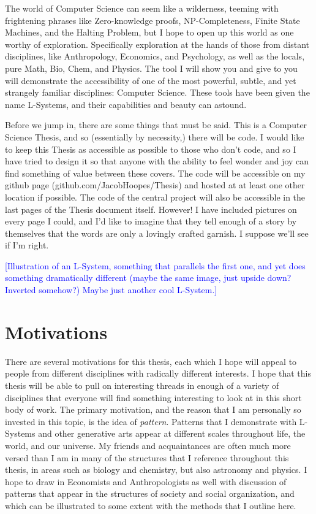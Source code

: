\documentclass[12pt,twoside]{reedthesis}
\begin{document}
The world of Computer Science can seem like a wilderness, teeming with frightening phrases like Zero-knowledge proofs, NP-Completeness, Finite State Machines, and the Halting Problem, but I hope to open up this world as one worthy of exploration. Specifically exploration at the hands of those from distant disciplines, like Anthropology, Economics, and Psychology, as well as the locals, pure Math, Bio, Chem, and Physics. The tool I will show you and give to you will demonstrate the accessibility of one of the most powerful, subtle, and yet strangely familiar disciplines: Computer Science. These tools have been given the name L-Systems, and their capabilities and beauty can astound.
	
Before we jump in, there are some things that must be said. This is a Computer Science Thesis, and so (essentially by necessity,) there will be code. I would like to keep this Thesis as accessible as possible to those who don’t code, and so I have tried to design it so that anyone with the ability to feel wonder and joy can find something of value between these covers. The code will be accessible on my github page (github.com/JacobHoopes/Thesis) and hosted at at least one other location if possible. The code of the central project will also be accessible in the last pages of the Thesis document itself. However! I have included pictures on every page I could, and I’d like to imagine that they tell enough of a story by themselves that the words are only a lovingly crafted garnish. I suppose we’ll see if I’m right. 
	
\textcolor{blue}{[Illustration of an L-System, something that parallels the first one, and yet does something dramatically different (maybe the same image, just upside down? Inverted somehow?) Maybe just another cool L-System.]}

\section{Motivations}
	
There are several motivations for this thesis, each which I hope will appeal to people from different disciplines with radically different interests. I hope that this thesis will be able to pull on interesting threads in enough of a variety of disciplines that everyone will find something interesting to look at in this short body of work. The primary motivation, and the reason that I am personally so invested in this topic, is the idea of \textit{pattern}. Patterns that I demonstrate with L-Systems and other generative arts appear at different scales throughout life, the world, and our universe. My friends and acquaintances are often much more versed than I am in many of the structures that I reference throughout this thesis, in areas such as biology and chemistry, but also astronomy and physics. I hope to draw in Economists and Anthropologists as well with discussion of patterns that appear in the structures of society and social organization, and which can be illustrated to some extent with the methods that I outline here.
\end{document}

